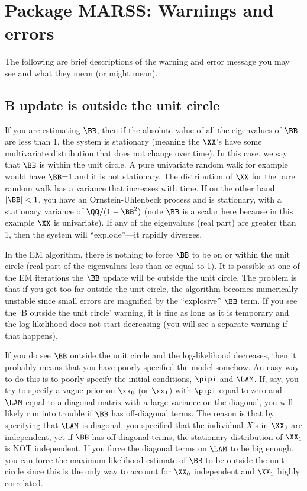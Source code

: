 \chapter{Package MARSS:  Warnings and errors}
\label{app:warnings}
The following are brief descriptions of the warning and error message you may see and what they mean (or might mean).

\section*{B update is outside the unit circle}
If you are estimating $\BB$, then if the absolute value of all the eigenvalues of $\BB$ are less than 1, the system is stationary (meaning the $\XX$'s have some multivariate distribution that does not change over time).  In this case, we say that $\BB$ is within the unit circle.  A pure univariate random walk for example would have $\BB$=1 and it is not stationary.  The distribution of $\XX$ for the pure random walk has a variance that increases with time.  If on the other hand $|\BB|<1$, you have an Ornstein-Uhlenbeck process and is stationary, with a stationary variance of $\QQ/(1-\BB^2)$ (note $\BB$ is a scalar here because in this example $\XX$ is univariate).  If any of the eigenvalues (real part) are greater than 1, then the system will ``explode''---it rapidly diverges.

In the EM algorithm, there is nothing to force $\BB$ to be on or within the unit circle (real part of the eigenvalues less than or equal to 1).  It is possible at one of the EM iterations the $\BB$ update will be outside the unit circle.  The problem is that if you get too far outside the unit circle, the algorithm becomes numerically unstable since small errors are magnified by the ``explosive'' $\BB$ term.  If you see the `B outside the unit circle' warning, it is fine as long as it is temporary and the log-likelihood does not start decreasing (you will see a separate warning if that happens).

If you do see $\BB$ outside the unit circle and the log-likelihood decreases, then it probably means that you have poorly specified the model somehow.  An easy way to do this is to poorly specify the initial conditions, $\pipi$ and $\LAM$.  If, say, you try to specify a vague prior on $\xx_0$ (or $\xx_1$) with $\pipi$ equal to zero and $\LAM$ equal to a diagonal matrix with a large variance on the diagonal, you will likely run into trouble if $\BB$ has off-diagonal terms.  The reason is that by specifying that $\LAM$ is diagonal, you specified that the individual $X$'s in $\XX_0$ are independent, yet if $\BB$ has off-diagonal terms, the stationary distribution of $\XX_1$ is NOT independent.  If you force the diagonal terms on $\LAM$ to be big enough, you can force the maximum-likelihood estimate of $\BB$ to be outside the unit circle since this is the only way to account for $\XX_0$ independent and $\XX_1$ highly correlated.  

